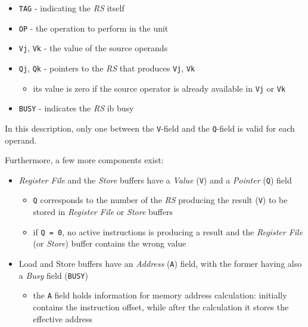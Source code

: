 \documentclass[english]{article}
\begin{document}
\begin{itemize}
  \item \texttt{TAG} - indicating the \textit{RS} itself
  \item \texttt{OP} - the operation to perform in the unit
  \item \texttt{Vj}, \texttt{Vk} - the value of the source operands
  \item \texttt{Qj}, \texttt{Qk} - pointers to the \textit{RS} that produces \texttt{Vj}, \texttt{Vk}
        \begin{itemize}
          \item its value is zero if the source operator is already available in \texttt{Vj} or \texttt{Vk}
        \end{itemize}
  \item \texttt{BUSY} - indicates the \textit{RS} ib busy
\end{itemize}

In this description, only one between the \texttt{V}-field and the \texttt{Q}-field is valid for each operand.

\bigskip
Furthermore, a few more components exist:

\begin{itemize}
  \item \textit{Register File} and the \textit{Store} buffers have a \textit{Value} (\texttt{V}) and a \textit{Pointer} (\texttt{Q}) field
        \begin{itemize}
          \item  \texttt{Q} corresponds to the number of the \textit{RS} producing the result (\texttt{V}) to be stored in \textit{Register File} or \textit{Store} buffers
          \item if \texttt{Q\ =\ 0}, no active instructions is producing a result and the \textit{Register File} (or \textit{Store}) buffer contains the wrong value
        \end{itemize}
  \item Load and Store buffers have an \textit{Address} (\texttt{A}) field, with the former having also a \textit{Busy} field (\texttt{BUSY})
        \begin{itemize}
          \item the \texttt{A} field holds information for memory address calculation: initially contains the instruction offset, while after the calculation it stores the effective address
        \end{itemize}
\end{itemize}
\end{document}
